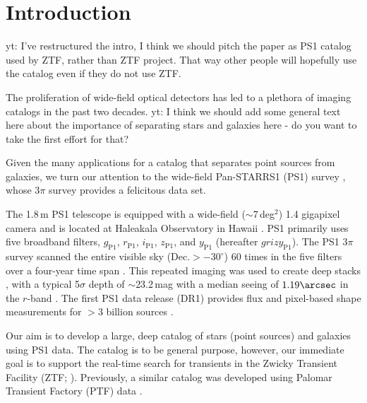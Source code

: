 \documentclass[twocolumn]{aastex62}
\newcommand{\yutaro}[1]{{\color{red} yt: {#1}}}
\begin{document}

\section{Introduction}\label{sec:intro}

\yutaro{I've restructured the intro, I think we should pitch the paper as PS1
catalog used by ZTF, rather than ZTF project. That way other people will
hopefully use the catalog even if they do not use ZTF.}

The proliferation of wide-field optical detectors has led to a plethora of
imaging catalogs in the past two decades. \yutaro{I think we should add some
general text here about the importance of separating stars and galaxies here
- do you want to take the first effort for that?}

Given the many applications for a catalog that separates point sources from
galaxies, we turn our attention to the wide-field Pan-STARRS1 (PS1) survey
\citep{Chambers16}, whose 3$\pi$ survey provides a felicitous data set.

The 1.8\,m PS1 telescope is equipped with a wide-field ($\sim$7\,deg$^2$) 1.4
gigapixel camera and is located at Haleakala Observatory in Hawaii
\citep{Hodapp04}. PS1 primarily uses five broadband filters,
$g_{\mathrm{P1}}$, $r_{\mathrm{P1}}$, $i_{\mathrm{P1}}$, $z_{\mathrm{P1}}$,
and $y_{\mathrm{P1}}$ (hereafter $grizy_{\mathrm{P1}}$). The PS1 3$\pi$
survey scanned the entire visible sky ($\mathrm{Dec.}>-30^\circ$) 60 times in
the five filters over a four-year time span \citep{Chambers16}. This repeated
imaging was used to create deep stacks \citep{Magnier16b}, with a typical
5$\sigma$ depth of $\sim$23.2\,mag with a median seeing of $1.19\arcsec$ in
the $r$-band \citep{Tonry12, Schlafly12, Chambers16}. The first PS1 data
release (DR1) provides flux and pixel-based shape measurements for $>$3
billion sources \citep{Flewelling16}.

Our aim is to develop a large, deep catalog of stars (point sources) and
galaxies using PS1 data. The catalog is to be general purpose, however, our
immediate goal is to support the real-time search for transients in the
Zwicky Transient Facility (ZTF; \citealt{Bellm18}). Previously, a similar
catalog was developed using Palomar Transient Factory (PTF) data
\citep{Miller17}. 
\end{document}
